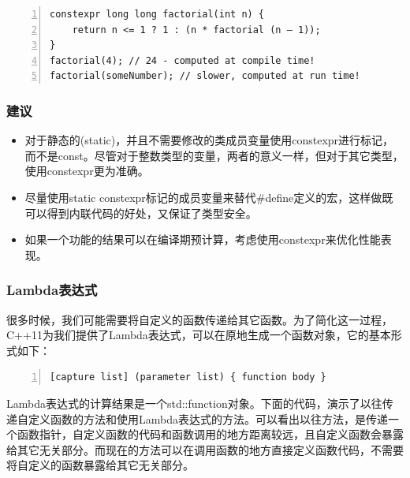 \documentclass{ctexart}
\begin{document}
\begin{lstlisting}[language={[ANSI]C},keywordstyle=\color{blue!70},commentstyle=\color{red!50!green!50!blue!50},frame=shadowbox, rulesepcolor=\color{red!20!green!20!blue!20},basicstyle=\small,numbers=left, numberstyle=\tiny,breaklines=true]
constexpr long long factorial(int n) {  
	return n <= 1 ? 1 : (n * factorial (n – 1));  
}
factorial(4); // 24 - computed at compile time!
factorial(someNumber); // slower, computed at run time!  
\end{lstlisting}

\subsubsection*{建议}

\begin{itemize}
	\item 对于静态的(static)，并且不需要修改的类成员变量使用constexpr进行标记，而不是const。尽管对于整数类型的变量，两者的意义一样，但对于其它类型，使用constexpr更为准确。
	\item 尽量使用static constexpr标记的成员变量来替代\#define定义的宏，这样做既可以得到内联代码的好处，又保证了类型安全。
	\item 如果一个功能的结果可以在编译期预计算，考虑使用constexpr来优化性能表现。
\end{itemize}

\subsubsection{Lambda表达式}

很多时候，我们可能需要将自定义的函数传递给其它函数。为了简化这一过程，C++11为我们提供了Lambda表达式，可以在原地生成一个函数对象，它的基本形式如下：

\begin{lstlisting}[language={[ANSI]C},keywordstyle=\color{blue!70},commentstyle=\color{red!50!green!50!blue!50},frame=shadowbox, rulesepcolor=\color{red!20!green!20!blue!20},basicstyle=\small,numbers=left, numberstyle=\tiny,breaklines=true]
[capture list] (parameter list) { function body }
\end{lstlisting}

Lambda表达式的计算结果是一个std::function对象。下面的代码，演示了以往传递自定义函数的方法和使用Lambda表达式的方法。可以看出以往方法，是传递一个函数指针，自定义函数的代码和函数调用的地方距离较远，且自定义函数会暴露给其它无关部分。而现在的方法可以在调用函数的地方直接定义函数代码，不需要将自定义的函数暴露给其它无关部分。
\end{document}
